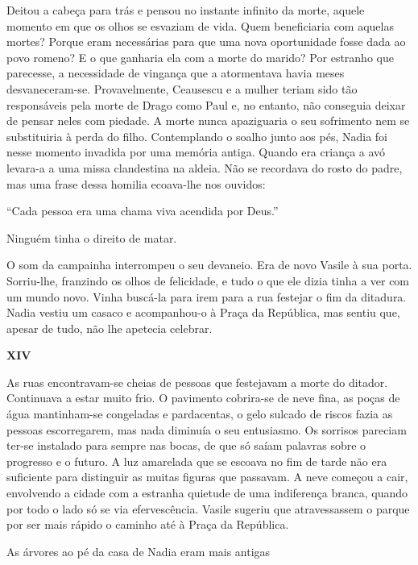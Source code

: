 Deitou a cabeça para trás e pensou no instante infinito da morte, aquele
momento em que os olhos se esvaziam de vida. Quem beneficiaria com
aquelas mortes? Porque eram necessárias para que uma nova oportunidade
fosse dada ao povo romeno? E o que ganharia ela com a morte do marido?
Por estranho que parecesse, a necessidade de vingança que a atormentava
havia meses desvaneceram-se. Provavelmente, Ceausescu e a mulher teriam
sido tão responsáveis pela morte de Drago como Paul e, no entanto, não
conseguia deixar de pensar neles com piedade. A morte nunca apaziguaria
o seu sofrimento nem se substituiria à perda do filho. Contemplando o
soalho junto aos pés, Nadia foi nesse momento invadida por uma memória
antiga. Quando era criança a avó levara-a a uma missa clandestina na
aldeia. Não se recordava do rosto do padre, mas uma frase dessa homilia
ecoava-lhe nos ouvidos:

``Cada pessoa era uma chama viva acendida por Deus.''

Ninguém tinha o direito de matar.

O som da campainha interrompeu o seu devaneio. Era de novo Vasile à sua
porta. Sorriu-lhe, franzindo os olhos de felicidade, e tudo o que ele
dizia tinha a ver com um mundo novo. Vinha buscá-la para irem para a rua
festejar o fim da ditadura. Nadia vestiu um casaco e acompanhou-o à
Praça da República, mas sentiu que, apesar de tudo, não lhe apetecia
celebrar.

\pagebreak
\vspace*{1.8cm}
\noindent{}\textbf{XIV}

\bigskip

As ruas encontravam-se cheias de pessoas que festejavam a morte do
ditador. Continuava a estar muito frio. O pavimento cobrira-se de neve
fina, as poças de água mantinham-se congeladas e pardacentas, o gelo
sulcado de riscos fazia as pessoas escorregarem, mas nada diminuía o seu
entusiasmo. Os sorrisos pareciam ter-se instalado para sempre nas bocas,
de que só saíam palavras sobre o progresso e o futuro. A luz amarelada
que se escoava no fim de tarde não era suficiente para distinguir as
muitas figuras que passavam. A neve começou a cair, envolvendo a cidade
com a estranha quietude de uma indiferença branca, quando por todo o
lado só se via efervescência. Vasile sugeriu que atravessassem o parque
por ser mais rápido o caminho até à Praça da República.

As árvores ao pé da casa de Nadia eram mais antigas

